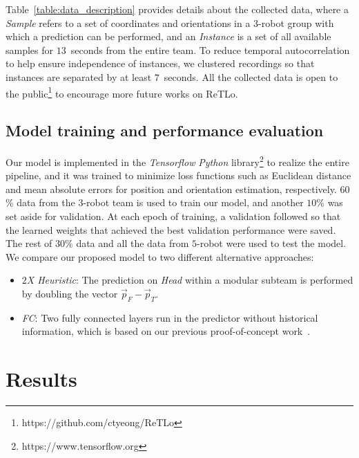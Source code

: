 \documentclass[letterpaper, 10 pt, conference]{ieeeconf}  %
\begin{document}
    Table~\ref{table:data_description} provides details about the
    collected data, where a \emph{Sample} refers to a set of coordinates and
    orientations in a 3-robot group with which a prediction can be
    performed, and an \emph{Instance} is a set of all available samples
    for $13$~seconds from the entire team. To reduce temporal
    autocorrelation to help ensure independence of instances, we
    clustered recordings so that instances are separated by at least
    $7$~seconds. All the collected data is open to the 
    public\footnote{https://github.com/ctyeong/ReTLo} to encourage more future works 
    on ReTLo.
        
   
    \subsection{Model training and performance evaluation}

    Our model is implemented in the \emph{Tensorflow} \emph{Python}
    library\footnote{https://www.tensorflow.org} to realize the entire
    pipeline, and it was trained to minimize loss functions such as
    Euclidean distance and mean absolute errors for position and
    orientation estimation, respectively. $60$\% data from the $3$-robot
    team is used to train our model, and another $10\%$ was set aside
    for validation. At each epoch of training, a validation followed so
    that the learned weights that achieved the best validation
    performance were saved. The rest of $30\%$ data and all the data
    from $5$-robot were used to test the model. We compare our proposed
    model to two different alternative approaches:
	\begin{itemize}
		\item \emph{$2$X Heuristic}:
            The prediction on \emph{Head} within a modular subteam is
            performed by doubling the vector $\vec{p}_{F} -
            \vec{p}_{T}$.

		\item \emph{FC}:
            Two fully connected layers run in the predictor without
            historical information, which is based on our previous
            proof-of-concept work~\cite{CPR17}.

	\end{itemize}

    \section{Results}
    \label{sec:results}
\end{document}
